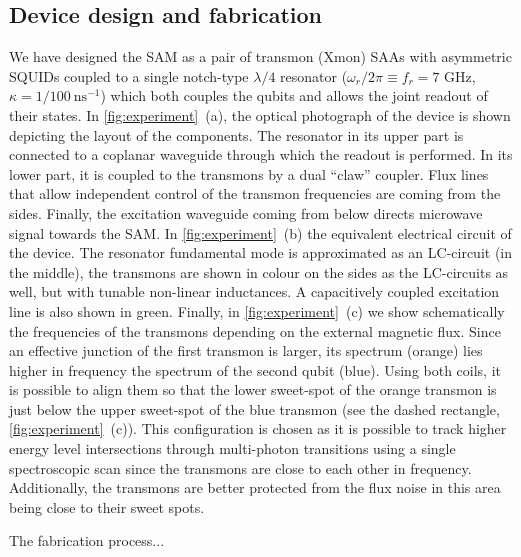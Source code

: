 \documentclass[%
 pra,
 amsmath,amssymb,
 reprint,%
]{revtex4-1}
\begin{document}
\subsection{Device design and fabrication}
We have designed the SAM as a pair of transmon (Xmon\cite{barends2013coherent}) SAAs with asymmetric SQUIDs\cite{hutchings2017tunable} coupled to a single notch-type\cite{probst2015efficient} $\lambda/4$ resonator ($\omega_r/2\pi \equiv f_r = 7$ GHz, $\kappa = 1/100\ \text{ns}^{-1}$) which both couples\cite{majer2007coupling} the qubits and allows the joint\cite{chow2010detecting} readout of their states. In \autoref{fig:experiment}~(a), the optical photograph of the device is shown depicting the layout of the components. The resonator in its upper part is connected to a coplanar waveguide through which the readout is performed. In its lower part, it is coupled to the transmons by a dual ``claw''\cite{barends2013coherent} coupler. Flux lines that allow independent control of the transmon frequencies are coming from the sides. Finally, the excitation waveguide coming from below directs microwave signal towards the SAM. In \autoref{fig:experiment}~(b) the equivalent electrical circuit of the device. The resonator fundamental mode is approximated as an LC-circuit (in the middle), the transmons are shown in colour on the sides as the LC-circuits as well, but with tunable non-linear inductances. A capacitively coupled excitation line is also shown in green. Finally, in \autoref{fig:experiment}~(c) we show schematically the frequencies of the transmons depending on the external magnetic flux. Since an effective junction of the first transmon is larger, its spectrum (orange) lies higher in frequency the spectrum of the second qubit (blue). Using both coils, it is possible to align them so that the lower sweet-spot of the orange transmon is just below the upper sweet-spot of the blue transmon (see the dashed rectangle,  \autoref{fig:experiment}~(c)). This configuration is chosen as it is possible to track higher energy level intersections through multi-photon transitions using a single spectroscopic scan since the transmons are close to each other in frequency. Additionally, the transmons are better protected from the flux noise in this area being close to their sweet spots.

The fabrication process...
\end{document}
